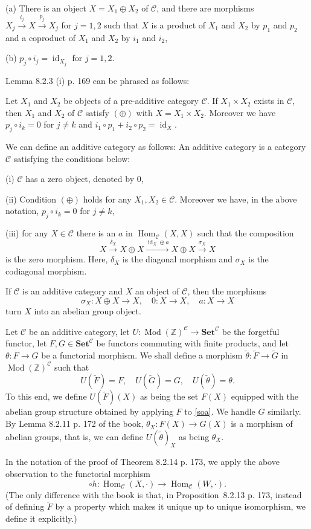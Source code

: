 \documentclass[12pt]{article}
\theoremstyle{remark}
\newcommand{\n}{\noindent}
\newcommand{\C}{\mathcal C}
\newcommand{\Set}{\textbf{Set}}
\newcommand{\xr}{\xrightarrow}
\newcommand{\be}{\begin{equation}}
\newcommand{\ee}{\end{equation}}
\newcommand{\pr}{Proposition}
\DeclareMathOperator{\id}{id}
\DeclareMathOperator{\h}{Hom}
\DeclareMathOperator{\Mod}{Mod}
\begin{document}
\n(a) There is an object $X=X_1\oplus X_2$ of $\C$, and there are morphisms $X_j\xr{i_j}X\xr{p_j}X_j$ for $j=1,2$ such that $X$ is a product of $X_1$ and $X_2$ by $p_1$ and $p_2$ and a coproduct of $X_1$ and $X_2$ by $i_1$ and $i_2$, 

\n(b) $p_j\circ i_j=\id_{X_j}$ for $j=1,2$. 

Lemma 8.2.3 (i) p. 169 can be phrased as follows: 

Let $X_1$ and $X_2$ be objects of a pre-additive category $\C$. If $X_1\times X_2$ exists in $\C$, then $X_1$ and $X_2$ of $\C$ satisfy $(\oplus)$ with $X=X_1\times X_2$. Moreover we have $p_j\circ i_k=0$ for $j\neq k$ and $i_1\circ p_1+i_2\circ p_2=\id_X$. 

We can define an additive category as follows: An additive category is a category $\C$ satisfying the conditions below: 

\n(i) $\C$ has a zero object, denoted by 0, 

\n(ii) Condition $(\oplus)$ holds for any $X_1,X_2\in\C$. Moreover we have, in the above notation, $p_j\circ i_k=0$ for $j\neq k$, 

\n(iii) for any $X\in\C$ there is an $a$ in $\h_\C(X,X)$ such that the composition 
$$ 
X\xr{\delta_X}X\oplus X\xr{\id_X\oplus a}X\oplus X\xr{\sigma_X}X 
$$ 
is the zero morphism. Here, $\delta_X$ is the diagonal morphism and $\sigma_X$ is the codiagonal morphism. 

If $\C$ is an additive category and $X$ an object of $\C$, then the morphisms 
% 
\be\label{soa} 
\sigma_X:X\oplus X\to X,\quad0:X\to X,\quad a:X\to X 
\ee 
%
turn $X$ into an abelian group object. 

Let $\C$ be an additive category, let $U:\Mod(\mathbb Z)^\C\to\Set^\C$ be the forgetful functor, let $F,G\in\Set^\C$ be functors commuting with finite products, and let $\theta:F\to G$ be a functorial morphism. We shall define a morphism $\widetilde\theta:\widetilde F\to\widetilde G$ in $\Mod(\mathbb Z)^\C$ such that 
$$ 
U(\widetilde F)=F,\quad U(\widetilde G)=G,\quad U(\widetilde\theta)=\theta. 
$$ 
To this end, we define $U(\widetilde F)(X)$ as being the set $F(X)$ equipped with the abelian group structure obtained by applying $F$ to \eqref{soa}. We handle $G$ similarly. By Lemma 8.2.11 p. 172 of the book, $\theta_X:F(X)\to G(X)$ is a morphism of abelian groups, that is, we can define $U(\widetilde\theta)_X$ as being $\theta_X$. 

In the notation of the proof of Theorem 8.2.14 p. 173, we apply the above observation to the functorial morphism 
$$ 
\circ h:\h_\C(X,\cdot)\to\h_\C(W,\cdot). 
$$ 
(The only difference with the book is that, in \pr\ 8.2.13 p. 173, instead of defining $\widetilde F$ by a property which makes it unique up to unique isomorphism, we define it explicitly.) 
%
\end{document}
